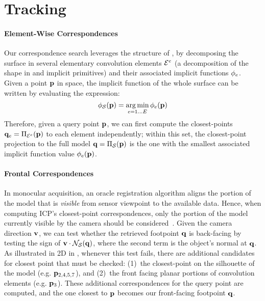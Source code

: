 \section{Tracking}





\paragraph{Element-Wise Correspondences}
Our correspondence search leverages the structure of , by decomposing the surface in several elementary convolution elements $\mathcal{E}^e$ (a decomposition of the shape in  and  implicit primitives) and their associated implicit functions $\phi_e$. Given a point $\mathbf{p}$ in space, the implicit function of the whole surface can be written by evaluating the expression:
\begin{equation}
\phi_{\mathcal{S}}(\mathbf{p}) = \operatorname*{arg\,min}_{e=1 \dots E} \phi_e(\mathbf{p})
\label{eq:piecewise}
\end{equation}
Therefore, given a query point $\mathbf{p}$, we can first compute the closest-points $\mathbf{q}_e = \Pi_{\mathcal{E}^e}(\mathbf{p})$ to each element independently; within this set, the closest-point projection to the full model $\mathbf{q} = \Pi_{\mathcal{S}}(\mathbf{p})$ is the one with the smallest associated implicit function value $\phi_e(\mathbf{p})$.

\paragraph{Frontal Correspondences}
In monocular acquisition, an oracle registration algorithm aligns the portion of the model that is \emph{visible} from sensor viewpoint to the available data. Hence, when computing ICP's closest-point correspondences, only the portion of the model currently visible by the camera should be considered~\cite{tagliasacchi2015robust}. Given the camera direction $\mathbf{v}$, we can test whether the retrieved footpoint $\mathbf{q}$ is back-facing by testing the sign of $\mathbf{v} \cdot \mathcal{N}_{\mathcal{S}}(\mathbf{q})$, where the second term is the object's normal at $\mathbf{q}$. As illustrated in 2D in , whenever this test fails, there are additional candidates for closest point that must be checked: (1)~the closest-point on the silhouette of the model (e.g. $\mathbf{p}_{2,4,5,7}$), and (2)~the front facing planar portions of convolution elements (e.g. $\mathbf{p}_{3}$). These additional correspondences for the query point are computed, and the one closest to $\mathbf{p}$ becomes our front-facing footpoint $\mathbf{q}$.



